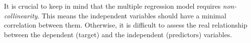 It is crucial to keep in mind that the multiple regression model requires \emph{non-collinearity}. This means the independent variables should have a minimal correlation between them. Otherwise, it is difficult to assess the real relationship between the dependent (target) and the independent (predictors) variables.

%
%
%
%
%
%

